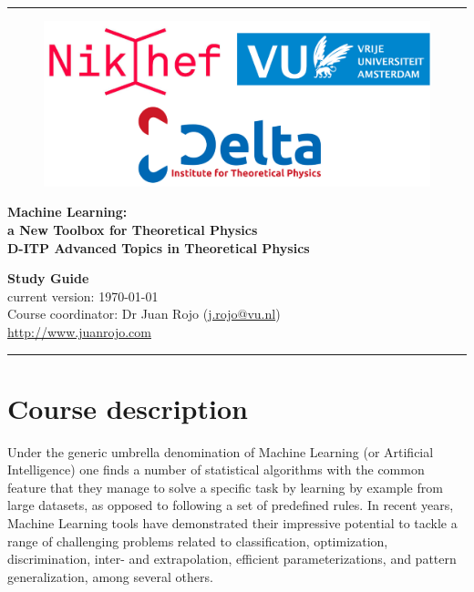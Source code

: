 \documentclass[12pt]{article}
\numberwithin{equation}{section}
\begin{document}
\begin{spacing}{1.1}
$\quad$\\
  \vskip50pt
\hrule
\vskip20pt

\begin{figure}[h]
\begin{center}
  \includegraphics[scale=0.36]{logo-ditp.pdf}\\
\end{center}
\end{figure}


\begin{center}
  {\bf \Large  Machine Learning: \\[0.2cm]a New Toolbox for Theoretical Physics}\\[0.4cm]
   {\bf \large  D-ITP Advanced Topics in Theoretical Physics}\\[0.8cm]
  \end{center}

 
\begin{center}
  {\Large \bf Study Guide}\\[0.3cm]
  current version: \today \\[0.3cm]

  {\large  Course coordinator: Dr Juan Rojo (\href{mailto:j.rojo@vu.nl}{j.rojo@vu.nl}})\\[0.3cm]
  {\large \url{http://www.juanrojo.com}}
\end{center}



\vskip30pt
\hrule
\vskip20pt

\clearpage

\section{Course description}

Under the generic umbrella denomination of Machine Learning (or Artificial Intelligence) one finds a number of statistical algorithms with the common feature that they manage to solve a specific task by learning by example from large datasets, as opposed to following a set of predefined rules. In recent years, Machine Learning tools have demonstrated their impressive potential to tackle a range of challenging problems related to classification, optimization, discrimination, inter- and extrapolation, efficient parameterizations, and pattern generalization, among several others.


\end{spacing}
\end{document}

